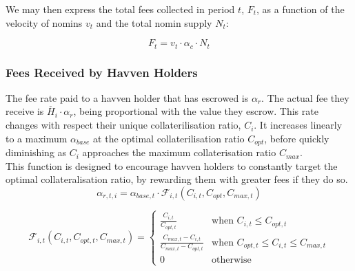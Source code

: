 \noindent We may then express the total fees collected in period $t$, $F_t$, as a function
of the velocity of nomins $v_t$ and the total nomin supply $N_t$:

\begin{equation}
    F_t = v_t \cdot \alpha_c \cdot N_t
\end{equation}

\newpage
\subsubsection{Fees Received by Havven Holders}

\noindent The fee rate paid to a havven holder that has escrowed is $\alpha_r$.
The actual fee they receive is $\check{H_i} \cdot \alpha_r$, being proportional with the value they escrow.
This rate changes with respect their unique collaterilisation ratio, $C_i$. It increases linearly to a maximum $\alpha_{base}$ at the optimal collaterilisation ratio $C_{opt}$, before quickly
diminishing as $C_i$ approaches the maximum collaterisation ratio $C_{max}$.  \\

\noindent This function is designed to encourage havven holders to constantly
target the optimal collateralisation ratio, by rewarding them with greater
fees if they do so.\\



\begin{equation}
\alpha_{r,t,i} = \alpha_{base,t} \cdot \mathcal{F}_{i,t}(C_{i,t}, C_{opt}, C_{max,t})  \label{eq:feesreceived}
\end{equation}

\begin{equation}
\mathcal{F}_{i,t}(C_{i,t}, C_{opt,t}, C_{max,t}) = 
\begin{cases}
 \frac{C_{i,t}}{C_{opt,t}} &\mbox{when } C_{i,t} \leq C_{opt,t} \\[1em]
 \frac{C_{max,t} - C_{i,t}}{C_{max,t} - C_{opt,t}} &\mbox{when } C_{opt,t} \leq C_{i,t} \leq C_{max,t} \\[1em]
 0 &\mbox{otherwise}
 \end{cases}
 \label{eq:7}
\end{equation}

